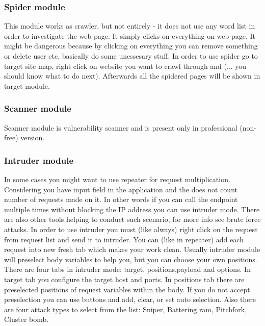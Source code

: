 \subsubsection{Spider module}
This module works as crawler, but not entirely - it does not use any word list in order to investigate the web page.
It simply clicks on everything on web page.
It might be dangerous because by clicking on everything you can remove something or delete user etc, basically do some unessesary stuff.
In order to use spider go to target site map, right click on website you want to crawl through and (... you should know what to do next).
Afterwards all the spidered pages will be shown in target module.


\subsubsection{Scanner module}

Scanner module is vulnerability scanner and is present only in professional (non-free) version.

\subsubsection{Intruder module}

In some cases you might want to use repeater for request multiplication.
Considering you have input field in the application and the does not count number of requests made on it.
In other words if you can call the endpoint multiple times without blocking the IP address you can use intruder mode.
There are also other tools helping to conduct such scenario, for more info see brute force attacks.\newline \newline
In order to use intruder you must (like always) right click on the request from request list and send it to intruder.
You can (like in repeater) add each request into new fresh tab which makes your work clean.
Usually intruder module will preselect body variables to help you, but you can choose your own positions.
There are four tabs in intruder mode: target, positions,payload and options.
In target tab you configure the target host and ports.
In positions tab there are preselected positions of request variables within the body.
If you do not accept preselection you can use buttons and add, clear, or set auto selection.
Also there are four attack types to select from the list: Sniper, Battering ram, Pitchfork, Cluster bomb.

